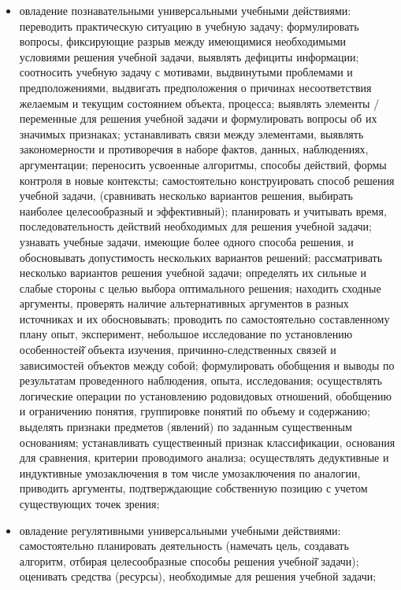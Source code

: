 \documentclass[
  11pt,
  russian,
]{book}
\begin{document}
\begin{itemize}
\item
  овладение познавательными универсальными учебными действиями:
  переводить практическую ситуацию в учебную задачу; формулировать
  вопросы, фиксирующие разрыв между имеющимися необходимыми условиями
  решения учебной задачи, выявлять дефициты информации; соотносить
  учебную задачу с мотивами, выдвинутыми проблемами и предположениями,
  выдвигать предположения о причинах несоответствия желаемым и текущим
  состоянием объекта, процесса; выявлять элементы / переменные для
  решения учебной задачи и формулировать вопросы об их значимых
  признаках; устанавливать связи между элементами, выявлять
  закономерности и противоречия в наборе фактов, данных, наблюдениях,
  аргументации; переносить усвоенные алгоритмы, способы действий, формы
  контроля в новые контексты; самостоятельно конструировать способ
  решения учебной задачи, (сравнивать несколько вариантов решения,
  выбирать наиболее целесообразный и эффективный); планировать и
  учитывать время, последовательность действий необходимых для решения
  учебной задачи; узнавать учебные задачи, имеющие более одного способа
  решения, и обосновывать допустимость нескольких вариантов решений;
  рассматривать несколько вариантов решения учебной задачи; определять
  их сильные и слабые стороны с целью выбора оптимального решения;
  находить сходные аргументы, проверять наличие альтернативных
  аргументов в разных источниках и их обосновывать; проводить по
  самостоятельно составленному плану опыт, эксперимент, небольшое
  исследование по установлению особенностей̆ объекта изучения,
  причинно-следственных связей и зависимостей объектов между собой;
  формулировать обобщения и выводы по результатам проведенного
  наблюдения, опыта, исследования; осуществлять логические операции по
  установлению родовидовых отношений, обобщению и ограничению понятия,
  группировке понятий по объему и содержанию; выделять признаки
  предметов (явлений) по заданным существенным основаниям; устанавливать
  существенный признак классификации, основания для сравнения, критерии
  проводимого анализа; осуществлять дедуктивные и индуктивные
  умозаключения в том числе умозаключения по аналогии, приводить
  аргументы, подтверждающие собственную позицию с учетом существующих
  точек зрения;
\item
  овладение регулятивными универсальными учебными действиями:
  самостоятельно планировать деятельность (намечать цель, создавать
  алгоритм, отбирая целесообразные способы решения учебной̆ задачи);
  оценивать средства (ресурсы), необходимые для решения учебной задачи;

\end{itemize}
\end{document}
